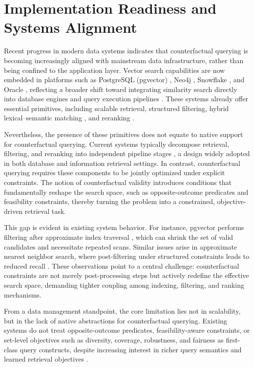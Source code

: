 \section{Implementation Readiness and Systems Alignment}
\label{sec:systems}


Recent progress in modern data systems indicates that counterfactual querying is becoming increasingly aligned with mainstream data infrastructure, rather than being confined to the application layer. Vector search capabilities are now embedded in platforms such as PostgreSQL (pgvector) \cite{pgvector}, Neo4j \cite{neo4jVector}, Snowflake \cite{snowflakeCortex}, and Oracle \cite{oracleHybridIndex,oracleSearch}, reflecting a broader shift toward integrating similarity search directly into database engines and query execution pipelines \cite{johnson2019billion}. These systems already offer essential primitives, including scalable retrieval, structured filtering, hybrid lexical--semantic matching \cite{yates2021pretrained,guu2020retrieval}, and reranking \cite{khattab2020colbert}.

Nevertheless, the presence of these primitives does not equate to native support for counterfactual querying. Current systems typically decompose retrieval, filtering, and reranking into independent pipeline stages \cite{croft2010search,miutra2018introduction}, a design widely adopted in both database and information retrieval settings. In contrast, counterfactual querying requires these components to be jointly optimized under explicit constraints. The notion of counterfactual validity introduces conditions that fundamentally reshape the search space, such as opposite-outcome predicates and feasibility constraints, thereby turning the problem into a constrained, objective-driven retrieval task.

This gap is evident in existing system behavior. For instance, pgvector performs filtering after approximate index traversal \cite{pgvector}, which can shrink the set of valid candidates and necessitate repeated scans. Similar issues arise in approximate nearest neighbor search, where post-filtering under structured constraints leads to reduced recall \cite{dong2011efficient,malkov2018efficient}. These observations point to a central challenge: counterfactual constraints are not merely post-processing steps but actively redefine the effective search space, demanding tighter coupling among indexing, filtering, and ranking mechanisms.

From a data management standpoint, the core limitation lies not in scalability, but in the lack of native abstractions for counterfactual querying. Existing systems do not treat opposite-outcome predicates, feasibility-aware constraints, or set-level objectives such as diversity, coverage, robustness, and fairness as first-class query constructs, despite increasing interest in richer query semantics and learned retrieval objectives \cite{pachera2025whatif}.

